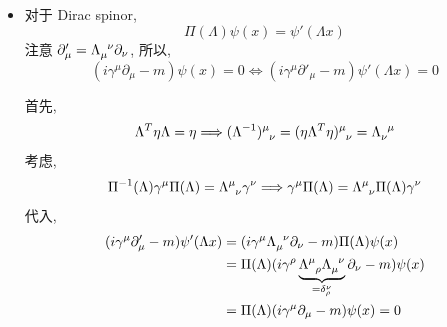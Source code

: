 \begin{itemize}
	\item 对于 Dirac spinor,
	\begin{equation}
		\Pi(\Lambda) \psi(x) = \psi'(\Lambda x)
	\end{equation}
	注意 $\partial'_\mu = \tensor{\Lambda}{_\mu^\nu} \partial_\nu$, 所以,
	\begin{equation}
		(i \gamma^\mu \partial_\mu - m) \psi(x) = 0 \iff (i \gamma^\mu \partial'_\mu - m) \psi'(\Lambda x) = 0
	\end{equation}
	
	\begin{tcolorbox}[title=calculation:]
		首先,
		\begin{equation}
			\Lambda^T \eta \Lambda = \eta \Longrightarrow \tensor{(\Lambda^{- 1})}{^\mu_\nu} = \tensor{(\eta \Lambda^T \eta)}{^\mu_\nu} = \tensor{\Lambda}{_\nu^\mu}
		\end{equation}
		考虑,
		\begin{equation}
			\Pi^{- 1}(\Lambda) \gamma^\mu \Pi(\Lambda) = \tensor{\Lambda}{^\mu_\nu} \gamma^\nu \Longrightarrow \gamma^\mu \Pi(\Lambda) = \tensor{\Lambda}{^\mu_\nu} \Pi(\Lambda) \gamma^\nu
		\end{equation}
		代入,
		\begin{align}
			(i \gamma^\mu \partial'_\mu - m) \psi'(\Lambda x) &= (i \gamma^\mu \tensor{\Lambda}{_\mu^\nu} \partial_\nu - m) \Pi(\Lambda) \psi(x) \notag \\
			&= \Pi(\Lambda) (i \gamma^\rho \underbrace{\tensor{\Lambda}{^\mu_\rho} \tensor{\Lambda}{_\mu^\nu}}_{= \delta^\nu_\rho} \partial_\nu - m) \psi(x) \notag \\
			&= \Pi(\Lambda) (i \gamma^\mu \partial_\mu - m) \psi(x) = 0
		\end{align}
	\end{tcolorbox}
\end{itemize}

